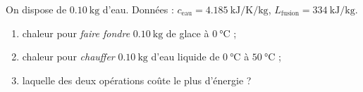 \documentclass[11pt,a4paper]{article}
\begin{document}
\begin{exo}
On dispose de $\qty{0.10}{\kilogram}$ d'eau. Données : $c_{\text{eau}}=\qty{4.185}{\kilo\joule\per\kelvin\per\kilogram}$, $L_{\text{fusion}}=\qty{334}{\kilo\joule\per\kilogram}$.
\begin{enumerate}[label=\alph*)]
  \item chaleur pour \emph{faire fondre} $\qty{0.10}{\kilogram}$ de glace à $\qty{0}{\celsius}$ ;
  \item chaleur pour \emph{chauffer} $\qty{0.10}{\kilogram}$ d'eau liquide de $\qty{0}{\celsius}$ à $\qty{50}{\celsius}$ ;
  \item laquelle des deux opérations coûte le plus d'énergie ?
\end{enumerate}
\end{exo}
\end{document}

